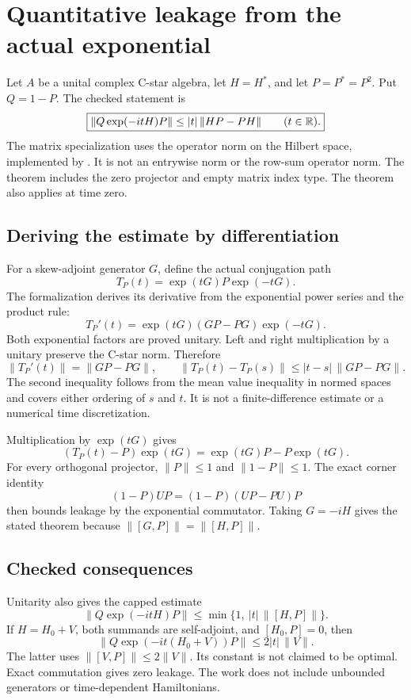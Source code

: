 \section{Quantitative leakage from the actual exponential}\label{supp4:section:001}
Let $A$ be a unital complex C-star algebra, let $H=H^*$, and let $P=P^*=P^2$. Put $Q=1-P$. The checked statement is
\[
\boxed{\|Q\exp(-itH)P\|\le |t|\,\|HP-PH\|\qquad(t\in\R).}
\]
The matrix specialization uses the operator norm on the Hilbert space, implemented by . It is not an entrywise norm or the row-sum operator norm. The theorem includes the zero projector and empty matrix index type. The theorem also applies at time zero.

\subsection{Deriving the estimate by differentiation}
For a skew-adjoint generator $G$, define the actual conjugation path
\[
T_P(t)=\exp(tG)P\exp(-tG).
\]
The formalization derives its derivative from the exponential power series and the product rule:
\[
T_P'(t)=\exp(tG)(GP-PG)\exp(-tG).
\]
Both exponential factors are proved unitary. Left and right multiplication by a unitary preserve the C-star norm. Therefore
\[
\|T_P'(t)\|=\|GP-PG\|,
\qquad
\|T_P(t)-T_P(s)\|\le |t-s|\,\|GP-PG\|.
\]
The second inequality follows from the mean value inequality in normed spaces and covers either ordering of $s$ and $t$. It is not a finite-difference estimate or a numerical time discretization.

Multiplication by $\exp(tG)$ gives
\[
(T_P(t)-P)\exp(tG)=\exp(tG)P-P\exp(tG).
\]
For every orthogonal projector, $\|P\|\le1$ and $\|1-P\|\le1$. The exact corner identity
\[
(1-P)UP=(1-P)(UP-PU)P
\]
then bounds leakage by the exponential commutator. Taking $G=-iH$ gives the stated theorem because $\|[G,P]\|=\|[H,P]\|$.

\subsection{Checked consequences}
Unitarity also gives the capped estimate
\[
\|Q\exp(-itH)P\|\le\min\{1,\ |t|\,\|[H,P]\|\}.
\]
If $H=H_0+V$, both summands are self-adjoint, and $[H_0,P]=0$, then
\[
\|Q\exp(-it(H_0+V))P\|\le2|t|\,\|V\|.
\]
The latter uses $\|[V,P]\|\le2\|V\|$. Its constant is not claimed to be optimal. Exact commutation gives zero leakage. The work does not include unbounded generators or time-dependent Hamiltonians.



